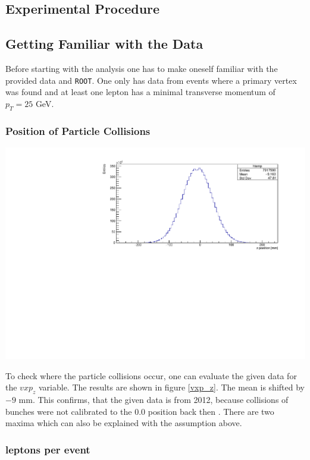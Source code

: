\documentclass[12pt, a4paper, bibliography=totoc]{scrartcl}
\begin{document}
\begin{multicols}{2}
\section{Experimental Procedure}

\subsection{Getting Familiar with the Data}
Before starting with the analysis one has to make oneself familiar with the provided data and \verb*+ROOT+.
One only has data from events where a primary vertex was found and at least one lepton has a minimal transverse momentum of $p_{T} = 25$ \si{GeV}.

\subsubsection{Position of Particle Collisions}
\begin{center}
	\includegraphics[width=\linewidth]{fig/vxp_z_final.pdf}
	\label{vxp_z}
\end{center}
To check where the particle collisions occur, one can evaluate the given data for the $vxp_z$ variable. 
The results are shown in figure \ref{vxp_z}.
The mean is shifted by $-9$ \si{mm}. 
This confirms, that the given data is from 2012, because collisions of bunches were not calibrated to the $0.0$ position back then \cite{atlasbeamspot}.
There are two maxima which can also be explained with the assumption above. 

\subsubsection{leptons per event}


\end{multicols}
\end{document}
